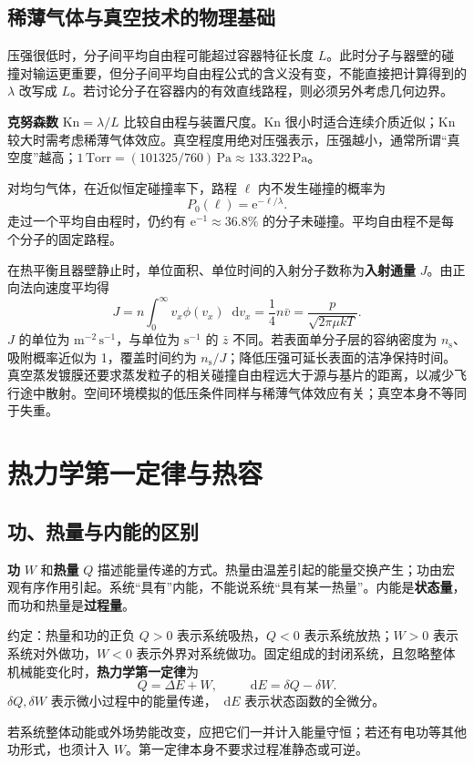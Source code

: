\documentclass[UTF8,fontset=none,zihao=-4,a4paper]{ctexart}
\newcommand{\chapterpage}[1]{\clearpage\section{#1}}
\newcommand{\term}[1]{\textbf{#1}}
\newcommand{\dd}{\mathop{}\!\mathrm{d}}
\newcommand{\ee}{\mathrm{e}}
\newcommand{\unit}[1]{\,\mathrm{#1}}
\begin{document}
\subsection{稀薄气体与真空技术的物理基础}
压强很低时，分子间平均自由程可能超过容器特征长度 $L$。此时分子与器壁的碰撞对输运更重要，但分子间平均自由程公式的含义没有变，不能直接把计算得到的 $\lambda$ 改写成 $L$。若讨论分子在容器内的有效直线路程，则必须另外考虑几何边界。

\term{克努森数} $\mathrm{Kn}=\lambda/L$ 比较自由程与装置尺度。$\mathrm{Kn}$ 很小时适合连续介质近似；$\mathrm{Kn}$ 较大时需考虑稀薄气体效应。真空程度用绝对压强表示，压强越小，通常所谓“真空度”越高；$1\unit{Torr}=(101325/760)\unit{Pa}\approx133.322\unit{Pa}$。

对均匀气体，在近似恒定碰撞率下，路程 $\ell$ 内不发生碰撞的概率为
\[
 P_0(\ell)=\ee^{-\ell/\lambda}.
\]
走过一个平均自由程时，仍约有 $\ee^{-1}\approx36.8\%$ 的分子未碰撞。平均自由程不是每个分子的固定路程。

在热平衡且器壁静止时，单位面积、单位时间的入射分子数称为\term{入射通量} $J$。由正向法向速度平均得
\[
 J=n\int_0^\infty v_x\phi(v_x)\dd v_x
 =\frac14n\bar v
 =\frac{p}{\sqrt{2\pi\mu kT}}.
\]
$J$ 的单位为 $\mathrm{m^{-2}\,s^{-1}}$，与单位为 $\mathrm{s^{-1}}$ 的 $\bar z$ 不同。若表面单分子层的容纳密度为 $n_{\mathrm s}$、吸附概率近似为 1，覆盖时间约为 $n_{\mathrm s}/J$；降低压强可延长表面的洁净保持时间。真空蒸发镀膜还要求蒸发粒子的相关碰撞自由程远大于源与基片的距离，以减少飞行途中散射。空间环境模拟的低压条件同样与稀薄气体效应有关；真空本身不等同于失重。

\chapterpage{热力学第一定律与热容}
\subsection{功、热量与内能的区别}
\term{功} $W$ 和\term{热量} $Q$ 描述能量传递的方式。热量由温差引起的能量交换产生；功由宏观有序作用引起。系统“具有”内能，不能说系统“具有某一热量”。内能是\term{状态量}，而功和热量是\term{过程量}。

\begin{infobox}{约定：热量和功的正负}
$Q>0$ 表示系统吸热，$Q<0$ 表示系统放热；$W>0$ 表示系统对外做功，$W<0$ 表示外界对系统做功。固定组成的封闭系统，且忽略整体机械能变化时，\term{热力学第一定律}为
\[
 Q=\Delta E+W,\qquad \dd E=\delta Q-\delta W.
\]
$\delta Q,\delta W$ 表示微小过程中的能量传递，$\dd E$ 表示状态函数的全微分。
\end{infobox}
若系统整体动能或外场势能改变，应把它们一并计入能量守恒；若还有电功等其他功形式，也须计入 $W$。第一定律本身不要求过程准静态或可逆。
\end{document}
